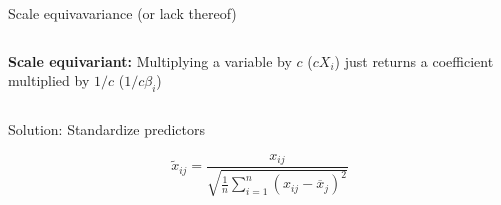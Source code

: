 \documentclass[aspectratio=169,usenames,dvipsnames]{beamer}
\newcommand{\InstructorList}[1]{
\begin{itemize}
	\color{orange}
	#1
\end{itemize}
}
\renewcommand{\InstructorList}[1]{}
\begin{document}
\begin{frame}[t]{Scale equivavariance (or lack thereof)}

\begin{columns}
\centering
\textbf{Scale equivariant:} Multiplying a variable by $c$ ($cX_i$) just returns a coefficient multiplied by $1/c$ ($1/c \beta_i$)

\centering
\InstructorList{
\item Ex: \texttt{income variable}.
\item Least squares is scale equivariant
\item Ridge regression very much is not
\item $X_j\hat \beta_{j,\lambda}^R$ depends not only on $\lambda$ but also on values of other predictors
}
\end{columns}

\end{frame}
\begin{frame}[t]{Solution: Standardize predictors}

\begin{equation*}
	\widetilde x_{ij} = \frac{x_{ij}}{
	\sqrt{ \tfrac{1}{n} \sum_{i=1}^n (x_{ij}-\overline x_j)^2}
	}
\end{equation*}
\begin{columns}
\centering
\InstructorList{
\item Denominator is estimated standard deviation of the jth predictor
\item Standardized predictors will all have a standard deviation of one
\item Previous figures showe standardized ridge regression coeffs on the $y$-axis
}
\centering

\end{columns}

\end{frame}
\end{document}
